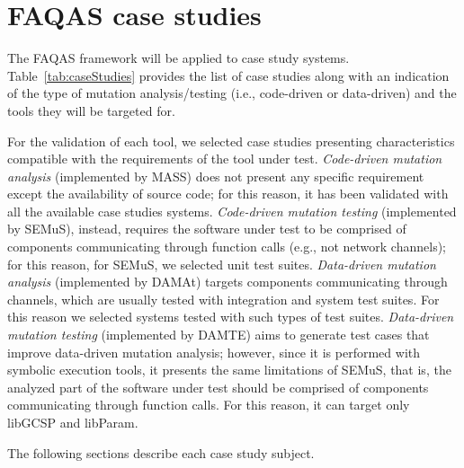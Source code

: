 
\chapter{FAQAS case studies}
\label{chapter:caseStudies}

The FAQAS framework will be applied to  case study systems. Table~\ref{tab:caseStudies} provides the list of case studies along with an indication of the type of mutation analysis/testing (i.e., code-driven or data-driven) and the tools they will be targeted for. 

\STARTCHANGEDWPT
For the validation of each tool, we selected case studies presenting characteristics compatible with the requirements of the tool under test. \emph{Code-driven mutation analysis} (implemented by MASS) does not present any specific requirement except the availability of source code; for this reason, it has been validated with all the available case studies systems.
\emph{Code-driven mutation testing} (implemented by SEMuS), instead, requires the software under test to be comprised of components communicating through function calls (e.g., not network channels); for this reason, for SEMuS, we selected unit test suites.
\emph{Data-driven mutation analysis} (implemented by DAMAt) targets components communicating through channels, which are usually tested with integration and system test suites. For this reason we selected systems tested with such types of test suites.
\emph{Data-driven mutation testing} (implemented by DAMTE) aims to generate test cases that improve data-driven mutation analysis; however, since it is performed with symbolic execution tools, it presents the same limitations of SEMuS, that is, the analyzed part of the software under test should be comprised of components communicating through function calls. For this reason, it can target only libGCSP and libParam.

The following sections describe each case study subject. 

